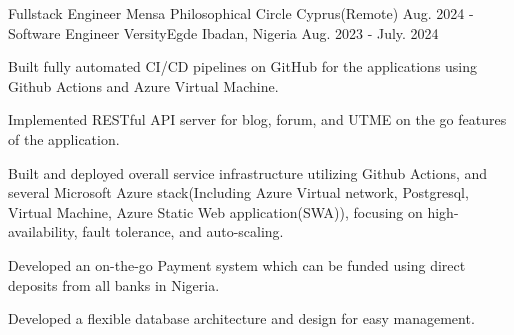 

\begin{cventries}

\cventry
{Fullstack Engineer} %
{Mensa Philosophical Circle} %
{Cyprus(Remote)} %
{Aug. 2024 - } %
{
}
  \cventry
    {Software Engineer} %
    {VersityEgde} %
    {Ibadan, Nigeria} %
    {Aug. 2023 - July. 2024} %
    {
      \begin{cvitems} %
        \item {Built fully automated CI/CD pipelines on GitHub for the applications using Github Actions and Azure Virtual Machine.}
        \item {Implemented RESTful API server for blog, forum, and UTME on the go features of the application.}
        \item {Built and deployed overall service infrastructure utilizing Github Actions, and several Microsoft Azure stack(Including Azure Virtual network, Postgresql, Virtual Machine, Azure Static Web application(SWA)), focusing on high-availability, fault tolerance, and auto-scaling.}
        \item {Developed an on-the-go Payment system which can be funded using direct deposits from all banks in Nigeria.}
        \item {Developed a flexible database architecture and design for easy management.}
      \end{cvitems}
    }

\end{cventries}
